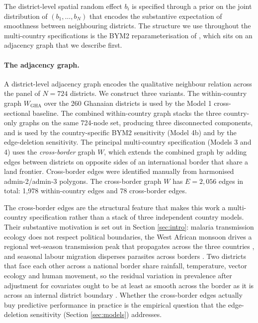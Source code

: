 \documentclass{article}
\begin{document}
\label{sec:spatial}

The district-level spatial random effect \(b_i\) is specified through a
prior on the joint distribution of \((b_1, \ldots, b_N)\) that encodes
the substantive expectation of smoothness between neighbouring
districts. The structure we use throughout the multi-country
specifications is the BYM2 reparameterisation of \citep{riebler2016},
which sits on an adjacency graph that we describe first.

\paragraph{The adjacency graph.}

A district-level adjacency graph encodes the qualitative neighbour
relation across the panel of \(N = 724\) districts. We construct three
variants. The within-country graph \(W_{\text{GHA}}\) over the 260
Ghanaian districts is used by the Model 1 cross-sectional baseline. The
combined within-country graph stacks the three country-only graphs on
the same 724-node set, producing three disconnected components, and is
used by the country-specific BYM2 sensitivity (Model 4b) and by the
edge-deletion sensitivity. The principal multi-country specification
(Models 3 and 4) uses the \emph{cross-border} graph \(W\), which extends
the combined graph by adding edges between districts on opposite sides
of an international border that share a land frontier. Cross-border
edges were identified manually from harmonised admin-2/admin-3 polygons.
The cross-border graph \(W\) has \(E = 2{,}056\) edges in total: 1,978
within-country edges and 78 cross-border edges.

The cross-border edges are the structural feature that makes this work a
multi-country specification rather than a stack of three independent
country models. Their substantive motivation is set out in Section
\ref{sec:intro}: malaria transmission ecology does not respect political
boundaries, the West African monsoon drives a regional wet-season
transmission peak that propagates across the three countries
\citep{bhatt2015}, and seasonal labour migration disperses parasites
across borders \citep{gething2011}. Two districts that face each other
across a national border share rainfall, temperature, vector ecology and
human movement, so the residual variation in prevalence after adjustment
for covariates ought to be at least as smooth across the border as it is
across an internal district boundary \citep{weiss2020}. Whether the
cross-border edges actually buy predictive performance in practice is
the empirical question that the edge-deletion sensitivity (Section
\ref{sec:models}) addresses.
\end{document}
